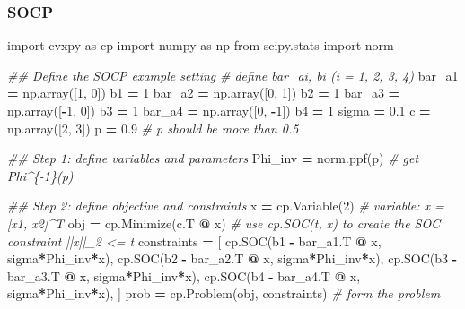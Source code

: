 \documentclass[
]{book}
\newenvironment{Shaded}{\begin{snugshade}}{\end{snugshade}}
\newcommand{\CommentTok}[1]{\textcolor[rgb]{0.56,0.35,0.01}{\textit{#1}}}
\newcommand{\DecValTok}[1]{\textcolor[rgb]{0.00,0.00,0.81}{#1}}
\newcommand{\FloatTok}[1]{\textcolor[rgb]{0.00,0.00,0.81}{#1}}
\newcommand{\ImportTok}[1]{#1}
\newcommand{\NormalTok}[1]{#1}
\newcommand{\OperatorTok}[1]{\textcolor[rgb]{0.81,0.36,0.00}{\textbf{#1}}}
\theoremstyle{definition}
\theoremstyle{definition}
\theoremstyle{definition}
\theoremstyle{definition}
\theoremstyle{remark}
\begin{document}
\subsubsection{SOCP}\label{socp}

\begin{Shaded}
\begin{Highlighting}[]
\ImportTok{import}\NormalTok{ cvxpy }\ImportTok{as}\NormalTok{ cp}
\ImportTok{import}\NormalTok{ numpy }\ImportTok{as}\NormalTok{ np}
\ImportTok{from}\NormalTok{ scipy.stats }\ImportTok{import}\NormalTok{ norm}

\CommentTok{\#\# Define the SOCP example setting}
\CommentTok{\# define bar\_ai, bi (i = 1, 2, 3, 4)}
\NormalTok{bar\_a1 }\OperatorTok{=}\NormalTok{ np.array([}\DecValTok{1}\NormalTok{, }\DecValTok{0}\NormalTok{])}
\NormalTok{b1 }\OperatorTok{=} \DecValTok{1}
\NormalTok{bar\_a2 }\OperatorTok{=}\NormalTok{ np.array([}\DecValTok{0}\NormalTok{, }\DecValTok{1}\NormalTok{])}
\NormalTok{b2 }\OperatorTok{=} \DecValTok{1}
\NormalTok{bar\_a3 }\OperatorTok{=}\NormalTok{ np.array([}\OperatorTok{{-}}\DecValTok{1}\NormalTok{, }\DecValTok{0}\NormalTok{])}
\NormalTok{b3 }\OperatorTok{=} \DecValTok{1}
\NormalTok{bar\_a4 }\OperatorTok{=}\NormalTok{ np.array([}\DecValTok{0}\NormalTok{, }\OperatorTok{{-}}\DecValTok{1}\NormalTok{])}
\NormalTok{b4 }\OperatorTok{=} \DecValTok{1}
\NormalTok{sigma }\OperatorTok{=} \FloatTok{0.1} 
\NormalTok{c }\OperatorTok{=}\NormalTok{ np.array([}\DecValTok{2}\NormalTok{, }\DecValTok{3}\NormalTok{])}
\NormalTok{p }\OperatorTok{=} \FloatTok{0.9} \CommentTok{\# p should be more than 0.5}

\CommentTok{\#\# Step 1: define variables and parameters}
\NormalTok{Phi\_inv }\OperatorTok{=}\NormalTok{ norm.ppf(p) }\CommentTok{\# get Phi\^{}\{{-}1\}(p)}

\CommentTok{\#\# Step 2: define objective and constraints}
\NormalTok{x }\OperatorTok{=}\NormalTok{ cp.Variable(}\DecValTok{2}\NormalTok{) }\CommentTok{\# variable: x = [x1, x2]\^{}T}
\NormalTok{obj }\OperatorTok{=}\NormalTok{ cp.Minimize(c.T }\OperatorTok{@}\NormalTok{ x)}
\CommentTok{\# use cp.SOC(t, x) to create the SOC constraint ||x||\_2 \textless{}= t}
\NormalTok{constraints }\OperatorTok{=}\NormalTok{ [}
\NormalTok{    cp.SOC(b1 }\OperatorTok{{-}}\NormalTok{ bar\_a1.T }\OperatorTok{@}\NormalTok{ x, sigma}\OperatorTok{*}\NormalTok{Phi\_inv}\OperatorTok{*}\NormalTok{x),}
\NormalTok{    cp.SOC(b2 }\OperatorTok{{-}}\NormalTok{ bar\_a2.T }\OperatorTok{@}\NormalTok{ x, sigma}\OperatorTok{*}\NormalTok{Phi\_inv}\OperatorTok{*}\NormalTok{x),}
\NormalTok{    cp.SOC(b3 }\OperatorTok{{-}}\NormalTok{ bar\_a3.T }\OperatorTok{@}\NormalTok{ x, sigma}\OperatorTok{*}\NormalTok{Phi\_inv}\OperatorTok{*}\NormalTok{x),}
\NormalTok{    cp.SOC(b4 }\OperatorTok{{-}}\NormalTok{ bar\_a4.T }\OperatorTok{@}\NormalTok{ x, sigma}\OperatorTok{*}\NormalTok{Phi\_inv}\OperatorTok{*}\NormalTok{x),}
\NormalTok{]}
\NormalTok{prob }\OperatorTok{=}\NormalTok{ cp.Problem(obj, constraints) }\CommentTok{\# form the problem}


\end{Highlighting}
\end{Shaded}
\end{document}
